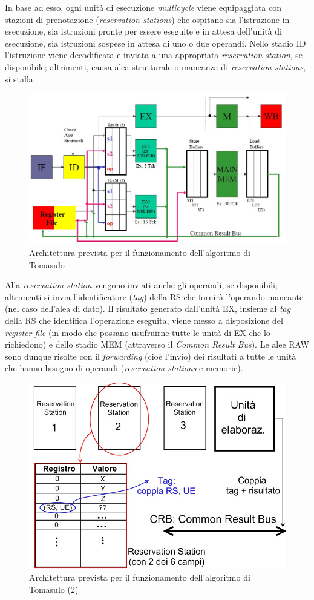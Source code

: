 In base ad esso, ogni unità di esecuzione \textit{multicycle} viene equipaggiata con stazioni di prenotazione (\textit{reservation stations}) che ospitano sia l'istruzione in esecuzione, sia istruzioni pronte per essere eseguite e in attesa dell'unità di esecuzione, sia istruzioni sospese in attesa di uno o due
operandi. Nello stadio ID l'istruzione viene decodificata e inviata a una appropriata \textit{reservation
station}, se disponibile; altrimenti, causa alea strutturale o mancanza di
\textit{reservation stations}, si stalla. 

\begin{figure}[!h]
\centering
\includegraphics[width=0.9\columnwidth]{img/tomasulo}
\caption{Architettura prevista per il funzionamento dell'algoritmo di Tomasulo}
\label{fig:tomasulo}
\end{figure}

Alla \textit{reservation station} vengono inviati anche gli operandi, se disponibili; altrimenti si invia l'identificatore (\textit{tag}) della RS che fornirà l'operando mancante (nel caso dell'alea di dato). Il risultato generato dall'unità EX, insieme al \textit{tag} della RS che identifica l'operazione eseguita, viene messo a disposizione del \textit{register file} (in modo che possano usufruirne tutte le unità di EX che lo richiedono) e dello stadio MEM (attraverso il \textit{Common Result Bus}). Le alee RAW sono dunque risolte con il \textit{forwarding} (cioè l'invio) dei risultati a tutte le unità che hanno bisogno di operandi (\textit{reservation stations} e memorie).

\begin{figure}[!h]
\centering
\includegraphics[width=0.75\columnwidth]{img/tomasulo2}
\caption{Architettura prevista per il funzionamento dell'algoritmo di Tomasulo (2)}
\label{fig:tomasulo2}
\end{figure}

